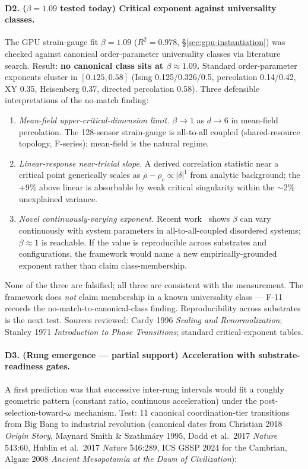 \documentclass[11pt,a4paper]{article}
\begin{document}
\paragraph{D2. ($\beta = 1.09$ tested today) Critical exponent against universality classes.} The GPU strain-gauge fit $\beta = 1.09$ ($R^2 = 0.978$, \S\ref{sec:gpu-instantiation}) was checked against canonical order-parameter universality classes via literature search. Result: \textbf{no canonical class sits at $\beta \approx 1.09$.} Standard order-parameter exponents cluster in $[0.125, 0.58]$ (Ising 0.125/0.326/0.5, percolation 0.14/0.42, XY 0.35, Heisenberg 0.37, directed percolation 0.58). Three defensible interpretations of the no-match finding:
\begin{enumerate}[leftmargin=*,itemsep=2pt,label=(\arabic*)]
  \item \textit{Mean-field upper-critical-dimension limit.} $\beta \to 1$ as $d \to 6$ in mean-field percolation. The 128-sensor strain-gauge is all-to-all coupled (shared-resource topology, F-series); mean-field is the natural regime.
  \item \textit{Linear-response near-trivial slope.} A derived correlation statistic near a critical point generically scales as $\rho - \rho_c \propto |\delta|^1$ from analytic background; the +9\% above linear is absorbable by weak critical singularity within the $\sim$2\% unexplained variance.
  \item \textit{Novel continuously-varying exponent.} Recent work~\cite{kuramoto_continuously_varying_2024, cml_continuously_varying_2025} shows $\beta$ can vary continuously with system parameters in all-to-all-coupled disordered systems; $\beta \approx 1$ is reachable. If the value is reproducible across substrates and configurations, the framework would name a new empirically-grounded exponent rather than claim class-membership.
\end{enumerate}
None of the three are falsified; all three are consistent with the measurement. The framework does \emph{not} claim membership in a known universality class --- F-11 records the no-match-to-canonical-class finding. Reproducibility across substrates is the next test. Sources reviewed: Cardy 1996 \emph{Scaling and Renormalization}; Stanley 1971 \emph{Introduction to Phase Transitions}; standard critical-exponent tables.

\paragraph{D3. (Rung emergence — partial support) Acceleration with substrate-readiness gates.} A first prediction was that successive inter-rung intervals would fit a roughly geometric pattern (constant ratio, continuous acceleration) under the post-selection-toward-$\omega$ mechanism. Test: 11 canonical coordination-tier transitions from Big Bang to industrial revolution (canonical dates from Christian 2018 \emph{Origin Story}, Maynard Smith \& Szathm\'ary 1995, Dodd et al.\ 2017 \emph{Nature} 543:60, Hublin et al.\ 2017 \emph{Nature} 546:289, ICS GSSP 2024 for the Cambrian, Algaze 2008 \emph{Ancient Mesopotamia at the Dawn of Civilization}):
\end{document}
